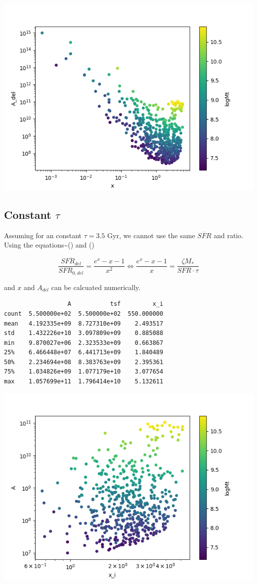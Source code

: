 \documentclass[a4paper]{article}
\begin{document}
\begin{center}
\includegraphics[width=.9\linewidth]{./graphs/x-A_3.png}
\end{center}

\subsection{Constant \(\tau\)}
\label{sec:org3e5bf87}
Assuming for an constant \(\tau=3.5\) Gyr, we cannot use the same \(\overline{SFR}\) and ratio. Using the equations\textasciitilde{}() and ()

$$
    \frac{\overline{SFR_{del}}}{SFR_{0,del}}=\frac{e^x-x-1}{x^2}\Leftrightarrow \frac{e^x-x-1}{x}=\frac{\zeta M_*}{SFR\cdot\tau}
$$

and \(x\) and \(A_{del}\) can be calcuated numerically.

\begin{verbatim}
                  A           tsf         x_i
count  5.500000e+02  5.500000e+02  550.000000
mean   4.192335e+09  8.727310e+09    2.493517
std    1.432226e+10  3.097809e+09    0.885088
min    9.870027e+06  2.323533e+09    0.663867
25%    6.466448e+07  6.441713e+09    1.840489
50%    2.234694e+08  8.383763e+09    2.395361
75%    1.034826e+09  1.077179e+10    3.077654
max    1.057699e+11  1.796414e+10    5.132611
\end{verbatim}


\begin{center}
\includegraphics[width=.9\linewidth]{./graphs/x-A_tau.png}
\end{center}
\end{document}
